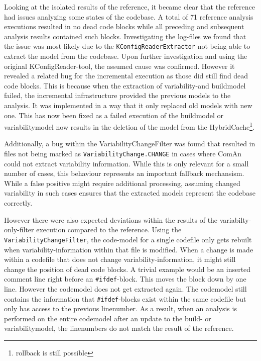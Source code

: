 \documentclass[a4paper]{article}
\begin{document}
Looking at the isolated results of the reference, it became clear that the reference had issues analyzing some states of the codebase. A total of 71 reference analysis executions resulted in no dead code blocks while all preceding and subsequent analysis results contained such blocks. Investigating the log-files we found that the issue was most likely due to the \texttt{KConfigReaderExtractor} not being able to extract the model from the codebase. Upon further investigation and using the original KConfigReader-tool, the assumed cause was confirmed. However it revealed a related bug for the incremental execution as those did still find dead code blocks. This is because when the extraction of variability-and buildmodel failed, the incremental infrastructure provided the previous models to the analysis. It was implemented in a way that it only replaced old models with new one. This has now been fixed as a failed execution of the buildmodel or variabilitymodel now results in the deletion of the model from the HybridCache\footnote{rollback is still possible}.

Additionally, a bug within the VariabilityChangeFilter was found that resulted in files not being marked as \texttt{VariabilityChange.CHANGE} in cases where ComAn could not extract variability information. While this is only relevant for a small number of cases, this behaviour represents an important fallback mechansism. While a false positive might require additional processing, assuming changed variability in such cases ensures that the extracted models represent the codebase correctly.

However there were also expected deviations within the results of the variabilty-only-filter execution compared to the reference. Using the \texttt{VariabilityChangeFilter}, the code-model for a single codefile only gets rebuilt when variability-information within that file is modified. When a change is made within a codefile that does not change variability-information, it might still change the position of dead code blocks. A trivial example would be an inserted comment line right before an \texttt{\#ifdef}-block. This moves the block down by one line. However the codemodel does not get extracted again. The codemodel still contains the information that \texttt{\#ifdef}-blocks exist within the same codefile but only has access to the previous linenumber. As a result, when an analysis is performed on the entire codemodel after an update to the build- or variabilitymodel, the linenumbers do not match the result of the reference.
\end{document}

